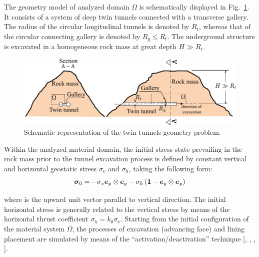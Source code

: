 \documentclass[a4paper,fleqn]{cas-sc}
\begin{document}
The geometry model of analyzed domain $\Omega$ is schematically displayed in Fig.~\ref{domain}. It consists of a system of deep twin tunnels connected with a transverse gallery. The radius of the circular longitudinal tunnels is denoted by $R_t$, whereas that of the circular connecting gallery is denoted by $R_g \le R_t$. The underground structure is excavated in a homogeneous rock mass at great depth $H \gg R_t$.
\begin{figure}[h!]
	\centering
	\includegraphics[scale=1]{Domain.pdf}
	\caption{Schematic representation of the twin tunnels geometry problem.}
	\label{domain}
\end{figure}
\FloatBarrier
Within the analyzed material domain, the initial stress state prevailing in the rock mass prior to the tunnel excavation process is defined by constant vertical and horizontal geostatic stress $\sigma_v$ and $\sigma_h$, taking the following form:
\begin{equation} \label{eq:stress0}
	\boldsymbol{\sigma}_0 = -\sigma_v \boldsymbol{e}_y \otimes \boldsymbol{e}_y - \sigma_h\left( \boldsymbol{1} - \boldsymbol{e}_y \otimes \boldsymbol{e}_y \right)
\end{equation}

where is the upward unit vector parallel to vertical direction. The initial horizontal stress is generally related to the vertical stress by means of the horizontal thrust coefficient $\sigma_h = k_0 \sigma_v$. Starting from the initial configuration of the material system $\Omega$, the processes of excavation (advancing face) and lining placement are simulated by means of the “activation/deactivation” technique [, , , ].
\end{document}
